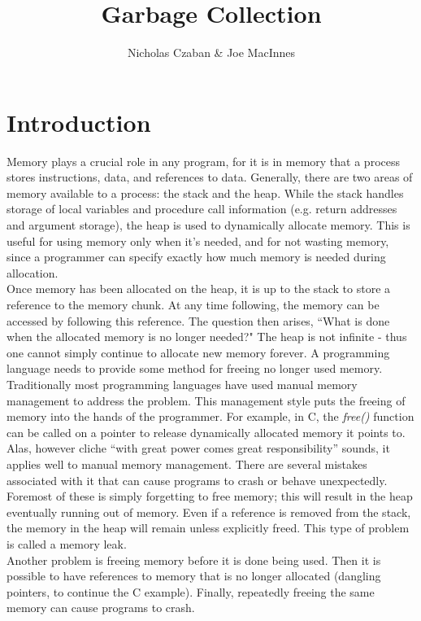 \documentclass[12pt]{article}
\begin{document}
\title{Garbage Collection}
\author{Nicholas Czaban \& Joe MacInnes}
\maketitle
\section{Introduction}
Memory plays a crucial role in any program, for it is in memory that a process stores instructions, data, and references to data. Generally, there are two areas of memory available to a process: the stack and the heap. While the stack handles storage of local variables and procedure call information (e.g. return addresses and argument storage), the heap is used to dynamically allocate memory. This is useful for using memory only when it's needed, and for not wasting memory, since a programmer can specify exactly how much memory is needed during allocation.\\

Once memory has been allocated on the heap, it is up to the stack to store a reference to the memory chunk. At any time following, the memory can be accessed by following this reference. The question then arises, ``What is done when the allocated memory is no longer needed?" The heap is not infinite - thus one cannot simply continue to allocate new memory forever. A programming language needs to provide some method for freeing no longer used memory.\\

Traditionally most programming languages have used manual memory management to address the problem. This management style puts the freeing of memory into the hands of the programmer. For example, in C, the \textit{free()} function can be called on a pointer to release dynamically allocated memory it points to.\\

Alas, however cliche ``with great power comes great responsibility'' sounds, it applies well to manual memory management. There are several mistakes associated with it that can cause programs to crash or behave unexpectedly. Foremost of these is simply forgetting to free memory; this will result in the heap eventually running out of memory. Even if a reference is removed from the stack, the memory in the heap will remain unless explicitly freed. This type of problem is called a memory leak.\\

Another problem is freeing memory before it is done being used. Then it is possible to have references to memory that is no longer allocated (dangling pointers, to continue the C example). Finally, repeatedly freeing the same memory can cause programs to crash. \cite{os_textbook}\\
\end{document}
